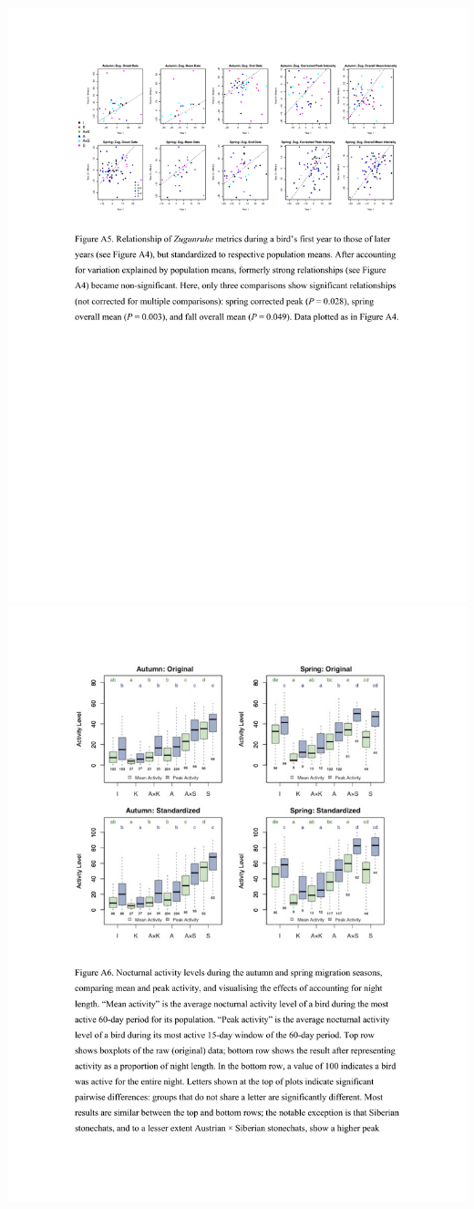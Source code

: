 \documentclass[a4paper, twoside]{templates/ociamthesis}
\begin{document}
\includegraphics[width=1\linewidth]{pdf_chapters/zug/zug_supp_crop_Part16}
\includegraphics[width=1\linewidth]{pdf_chapters/zug/zug_supp_crop_Part17}
\end{document}
